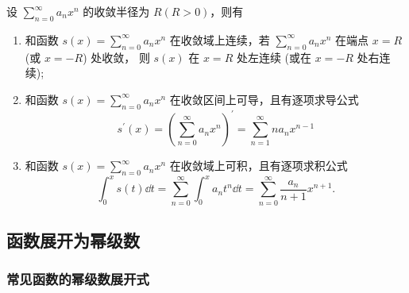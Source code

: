 \begin{theorem}[幂级数的性质]
    设 $\displaystyle \sum_{n=0}^{\infty} a_{n} x^{n} $ 的收敛半径为 $ R(R>0) $，则有
    \begin{enumerate}[label=(\arabic{*})]
        \item 和函数 $\displaystyle s(x)=\sum_{n=0}^{\infty} a_{n} x^{n} $ 在收敛域上连续，若 $\displaystyle \sum_{n=0}^{\infty} a_{n} x^{n} $ 在端点 $ x=R $ (或 $ x=-R$)  处收敛，
              则 $ s(x) $ 在 $ x=R $ 处左连续 (或在 $ x=-R $ 处右连续);
        \item 和函数 $\displaystyle s(x)=\sum_{n=0}^{\infty} a_{n} x^{n} $ 在收敛区间上可导，且有逐项求导公式
              $$s^{\prime}(x)=\left(\sum_{n=0}^{\infty} a_{n} x^{n}\right)^{\prime}=\sum_{n=1}^{\infty} n a_{n} x^{n-1} $$
        \item 和函数 $\displaystyle s(x)=\sum_{n=0}^{\infty} a_{n} x^{n} $ 在收敛域上可积，且有逐项求积公式
              $$\int_{0}^{x}s(t)\dd t=\sum_{n=0}^{\infty}\int_{0}^{x}a_nt^n\dd t=\sum_{n=0}^{\infty}\dfrac{a_n}{n+1}x^{n+1}.$$
    \end{enumerate}
\end{theorem}

\subsection{函数展开为幂级数}

\subsubsection{常见函数的幂级数展开式}

